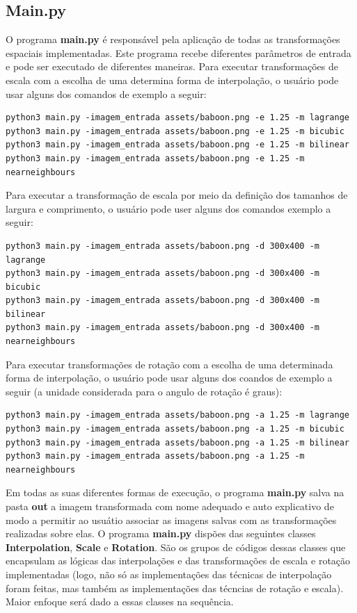\documentclass{article}
\begin{document}
\subsection{Main.py}
O programa \textbf{main.py} é responsável pela aplicação de todas as transformações espaciais implementadas. Este programa recebe diferentes parâmetros de entrada e pode ser executado de diferentes maneiras. Para executar transformações de escala com a escolha de uma determina forma de interpolação, o usuário pode usar alguns dos comandos de exemplo a seguir:
\begin{lstlisting}
python3 main.py -imagem_entrada assets/baboon.png -e 1.25 -m lagrange
python3 main.py -imagem_entrada assets/baboon.png -e 1.25 -m bicubic
python3 main.py -imagem_entrada assets/baboon.png -e 1.25 -m bilinear
python3 main.py -imagem_entrada assets/baboon.png -e 1.25 -m nearneighbours
\end{lstlisting}

\noindent
Para executar a transformação de escala por meio da definição dos tamanhos de largura e comprimento, o usuário pode user alguns dos comandos exemplo a seguir:
\begin{lstlisting}
python3 main.py -imagem_entrada assets/baboon.png -d 300x400 -m lagrange
python3 main.py -imagem_entrada assets/baboon.png -d 300x400 -m bicubic
python3 main.py -imagem_entrada assets/baboon.png -d 300x400 -m bilinear
python3 main.py -imagem_entrada assets/baboon.png -d 300x400 -m nearneighbours
\end{lstlisting}

\noindent
Para executar transformações de rotação com a escolha de uma determinada forma de interpolação, o usuário pode usar alguns dos coandos de exemplo a seguir (a unidade considerada para o angulo de rotação é graus):
\begin{lstlisting}
python3 main.py -imagem_entrada assets/baboon.png -a 1.25 -m lagrange
python3 main.py -imagem_entrada assets/baboon.png -a 1.25 -m bicubic
python3 main.py -imagem_entrada assets/baboon.png -a 1.25 -m bilinear
python3 main.py -imagem_entrada assets/baboon.png -a 1.25 -m nearneighbours
\end{lstlisting}


Em todas as suas diferentes formas de execução, o programa \textbf{main.py} salva na pasta \textbf{out} a imagem transformada com nome adequado e auto explicativo de modo a permitir ao usuátio associar as imagens salvas com as transformações realizadas sobre elas. O programa \textbf{main.py} dispões das seguintes classes \textbf{Interpolation}, \textbf{Scale} e \textbf{Rotation}. São os grupos de códigos dessas classes que encapsulam as lógicas das interpolações e das transformações de escala e rotação implementadas (logo, não só as implementações das técnicas de interpolação foram feitas, mas também as implementações das técncias de rotação e escala). Maior enfoque será dado a essas classes na sequência.
\end{document}
